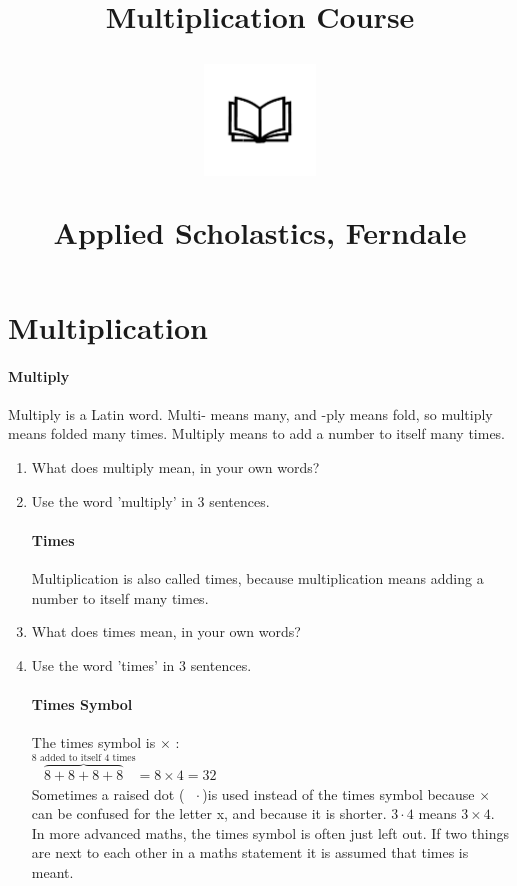 \documentclass[12pt]{article}
\title{Multiplication Course\\
\begin{center}
\includegraphics[width=4em]{ApS_logo.png}
\end{center}
\begin{normalsize}Applied Scholastics, Ferndale \end{normalsize}}
\author{}
\date{}
\begin{document}
\maketitle

\section*{Multiplication}

\paragraph{Multiply}
Multiply is a Latin word. Multi- means many, and -ply means fold, so multiply means folded many times. Multiply means to add a number to itself many times.\\

\begin{enumerate}

\item What does multiply mean, in your own words?
\item Use the word 'multiply' in 3 sentences.

\paragraph{Times}
Multiplication is also called times, because multiplication means adding a number to itself many times.\\

\item What does times mean, in your own words?
\item Use the word 'times' in 3 sentences.

\paragraph{Times Symbol}
The times symbol is $\times$ :\\

$\overbrace{8+8+8+8}^{\textrm{8 added to itself 4 times}}= 8 \times 4 = 32$\\

Sometimes a raised dot ($\text{ }\cdot$\text{ })is used instead of the times symbol because $\times$ can be confused for the letter x, and because it is shorter. $3 \cdot 4$ means $3 \times 4$.\\

In more advanced maths, the times symbol is often just left out. If two things are next to each other in a maths statement it is assumed that times is meant.\\


\end{enumerate}
\end{document}
